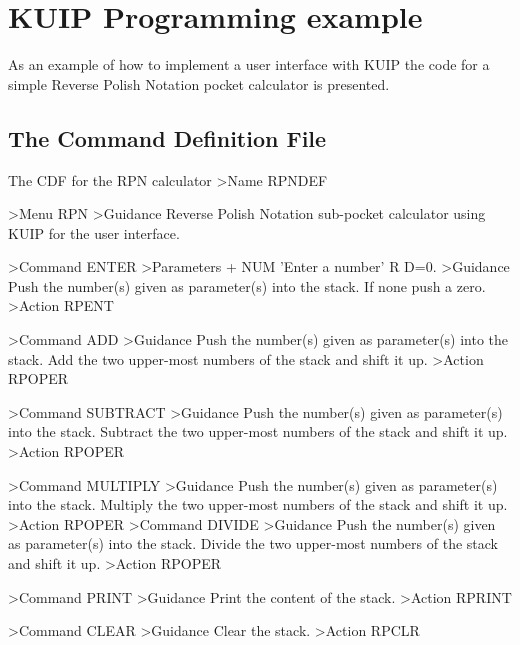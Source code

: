 
\chapter{KUIP Programming example}

As an example of how to implement a user interface with KUIP the code
for a simple Reverse Polish Notation pocket calculator is presented.
%
%
\section{The Command Definition File}
\begin{XMPt}{The CDF for the RPN calculator}
>Name RPNDEF
 
>Menu RPN
>Guidance
Reverse Polish Notation sub-pocket calculator
using KUIP for the user interface.
 
>Command ENTER
>Parameters
+
NUM 'Enter a number' R D=0.
>Guidance
Push the number(s) given as parameter(s) into the stack.
If none push a zero.
>Action RPENT
 
>Command ADD
>Guidance
Push the number(s) given as parameter(s) into the stack.
Add the two upper-most numbers of the stack and shift it up.
>Action RPOPER
 
>Command SUBTRACT
>Guidance
Push the number(s) given as parameter(s) into the stack.
Subtract the two upper-most numbers of the stack and shift it up.
>Action RPOPER
 
>Command MULTIPLY
>Guidance
Push the number(s) given as parameter(s) into the stack.        
Multiply the two upper-most numbers of the stack and shift it up.
>Action RPOPER
>Command DIVIDE
>Guidance
Push the number(s) given as parameter(s) into the stack.
Divide the two upper-most numbers of the stack and shift it up.
>Action RPOPER
 
>Command PRINT
>Guidance
Print the content of the stack.
>Action RPRINT
 
>Command CLEAR
>Guidance
Clear the stack.
>Action RPCLR
\end{XMPt}
%
%
